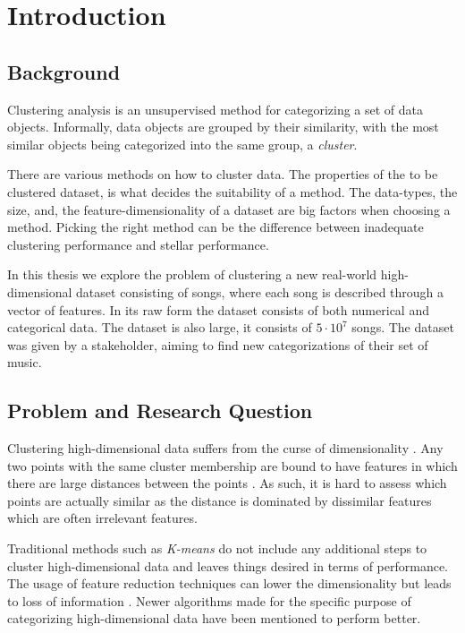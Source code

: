 \documentclass[../report.tex]{subfiles}
\begin{document}
\chapter{Introduction}

\section{Background}
Clustering analysis is an unsupervised method for categorizing a set of data objects. Informally, data objects are grouped by their similarity, with the most similar objects being categorized into the same group, a \textit{cluster}.

There are various methods on how to cluster data. The properties of the to be clustered dataset, is what decides the suitability of a method.
The data-types, the size, and, the feature-dimensionality of a dataset are big factors when choosing a method. Picking the right method can be the difference between inadequate clustering performance and stellar performance.

In this thesis we explore the problem of clustering a new real-world high-dimensional dataset consisting of songs, where each song is described through a vector of features. In its raw form the dataset consists of both numerical and categorical data. The dataset is also large, it consists of $5 \cdot 10^7$ songs. The dataset was given by a stakeholder, aiming to find new categorizations of their set of music.

\section{Problem and Research Question}
Clustering high-dimensional data suffers from the curse of dimensionality \cite{Jain1999, Parsons2004, Deng2010}. Any two points with the same cluster membership are bound to have features in which there are large distances between the points \cite{Domeniconi2007}. As such, it is hard to assess which points are actually similar as the distance is dominated by dissimilar features which are often irrelevant features.

Traditional methods such as \textit{K-means} do not include any additional steps to cluster high-dimensional data and leaves things desired in terms of performance. The usage of feature reduction techniques can lower the dimensionality but leads to loss of information \cite{Gan2006}.  Newer algorithms made for the specific purpose of categorizing high-dimensional data have been mentioned to perform better.
\end{document}
